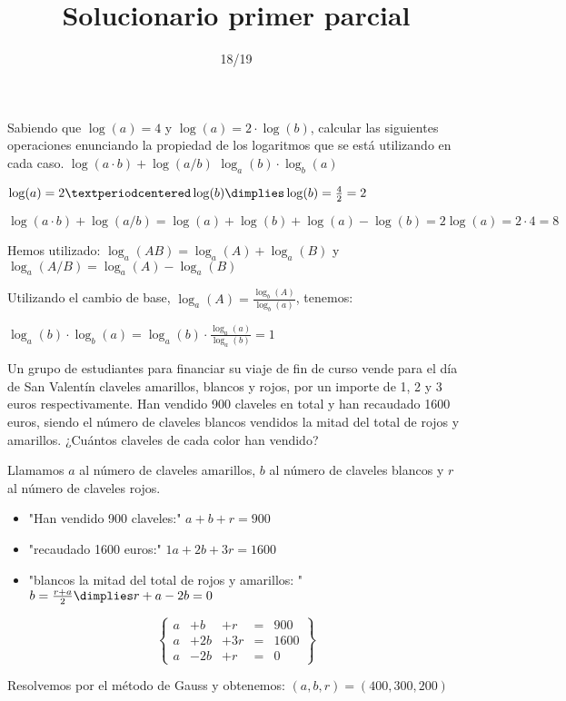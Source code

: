 \documentclass[palatino,nosec,nochap]{Docencia}
\title{Solucionario primer parcial}
\author{}
\date{18/19}
\newcommand\BackgroundPic{%
\put(0,0){%
\parbox[b][\paperheight]{\paperwidth}{%
\vfill
\centering
\vfill
}}}
\begin{document}
\pagestyle{plain}
\maketitle

\AddToShipoutPicture{\BackgroundPic}

\newpage


\begin{problem}[1]
Sabiendo que $\log(a) = 4$ y $\log(a) = 2·\log(b)$, calcular las siguientes operaciones enunciando la propiedad de los logaritmos que se está utilizando en cada caso.
\ppart $\log(a·b) + \log(a/b)$
\ppart $\log_a(b)·\log_b(a)$

\solution

$\log(a) = 2·\log(b) \dimplies \log(b) = \frac{4}{2} = 2$

\spart $\log(a·b) + \log(a/b) = \log(a) + \log(b) +\log(a) - \log(b) = 2\log(a) = 2·4 = 8$

Hemos utilizado: $\log_a(AB) = \log_a(A) + \log_a(B)$ y $\log_a(A/B) = \log_a(A) - \log_a(B)$

\spart Utilizando el cambio de base, $\log_a(A) = \frac{\log_b(A)}{\log_b(a)}$, tenemos:

$\log_a(b)·\log_b(a) = \log_a(b) · \frac{\log_a(a)}{\log_a(b)} = 1$

\end{problem}

\begin{problem}

Un grupo de estudiantes para financiar su viaje de fin de curso vende para el día de San Valentín claveles amarillos, blancos y rojos, por un importe de 1, 2 y 3 euros respectivamente. Han vendido 900 claveles en total y han recaudado 1600 euros, siendo el número de claveles blancos vendidos la mitad del total de rojos y amarillos. ¿Cuántos claveles de cada color han vendido?

\solution

Llamamos $a$ al número de claveles amarillos, $b$ al número de claveles blancos y $r$ al número de claveles rojos.

\begin{itemize}
	\item "Han vendido 900 claveles:" $a+b+r = 900$
	\item "recaudado 1600 euros:" $1a+2b+3r = 1600$
	\item "blancos la mitad del total de rojos y amarillos: " $b = \frac{r+a}{2} \dimplies r+a-2b=0$
\end{itemize}

\[
\left\{\begin{array}{lcccl}
a&+b&+r&=&900\\
a&+2b&+3r&=&1600\\
a&-2b&+r&=&0
\end{array}\right\}
\]

Resolvemos por el método de Gauss y obtenemos: $(a,b,r) = (400,300,200)$

\end{problem}
\end{document}
